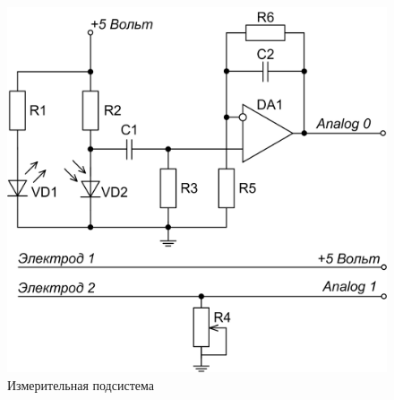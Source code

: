\documentclass[10pt, a5paper]{article}
\begin{document}
\begin{figure}[h!]
  \centering 
  \includegraphics[scale=0.7]{18_2015_fig1}
  \caption{Измерительная подсистема} \label{latij1}
\end{figure}
\end{document}
